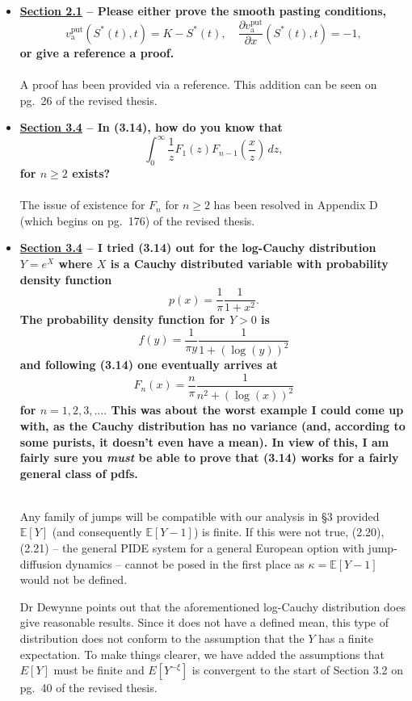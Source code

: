 \documentclass{article}
\begin{document}
\begin{enumerate}
\begin{itemize}
		\item \textbf{ \underline{Section 2.1} -- Please either prove the smooth pasting conditions,
			$$
				v_\text{a}^\text{put}(S^*(t),t) = K - S^*(t), \quad \frac{\partial v_\text{a}^\text{put}}{\partial x}(S^*(t),t) = -1,
			$$
			or give a reference a proof.\\ \\}
			A proof has been provided via a reference. This addition can be seen on pg.~26 of the revised thesis.
			
		\item \textbf{\underline{Section 3.4} -- In (3.14), how do you know that
			$$
				\int_0^\infty \frac{1}{z}F_1(z)F_{n-1}\left(\frac{x}{z}\right) \, d z,
			$$
		for $n \geq 2$ exists? \\ \\}
    		The issue of existence for $F_n$ for $n \geq 2$ has been resolved in Appendix D (which begins on pg.~176) of the revised thesis.
		
		\item \textbf{\underline{Section 3.4} -- I tried (3.14) out for the log-Cauchy distribution $Y = e^X$ where $X$ is a Cauchy distributed variable with probability density function
		$$
			p(x) = \frac{1}{\pi}\frac{1}{1+x^2}.
		$$
		The probability density function for $Y > 0$ is
		$$
			f(y) = \frac{1}{\pi y}\frac{1}{1 + (\log(y))^2}
		$$
		and following (3.14) one eventually arrives at
		$$
			F_n(x) = \frac{n}{\pi} \frac{1}{n^2 + (\log(x))^2}
		$$
		for $n = 1,2,3, \ldots.$ This was about the worst example I could come up with, as the Cauchy distribution has no variance (and, according to some purists, it doesn't even have a mean). In view of this, I am fairly sure you \emph{must} be able to prove that (3.14) works for a fairly general class of pdfs.\\ \\}
		
		Any family of jumps will be compatible with our analysis in \S3 provided $\mathbb{E}[Y]$ (and consequently $\mathbb{E}[Y-1]$) is finite. If this were not true, (2.20), (2.21) -- the general PIDE system for a general European option with jump-diffusion dynamics -- cannot be posed in the first place as $\kappa = \mathbb{E}[Y-1]$ would not be defined. 
	
	Dr Dewynne points out that the aforementioned log-Cauchy distribution does give reasonable results. Since it does not have a defined mean, this type of distribution does not conform to the assumption that the $Y$ has a finite expectation. To make things clearer, we have added the assumptions that $E[Y]$ must be finite and $E[Y^{-\xi}]$ is convergent to the start of Section 3.2 on pg.~40 of the revised thesis.
	

\end{itemize}
\end{enumerate}
\end{document}
